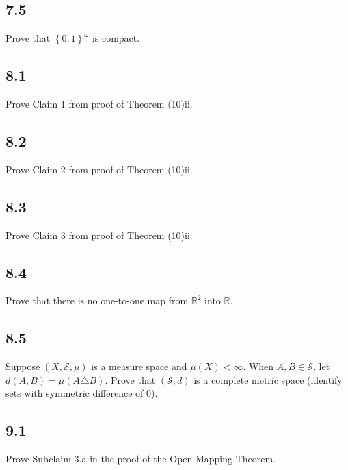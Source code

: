 \documentclass[12pt]{article}
\begin{document}
\subsection*{7.5}
\begin{tcolorbox}
  Prove that $\left\{ 0,1 \right\}^{\omega}$ is compact.
\end{tcolorbox}


\newpage
\subsection*{8.1}
\begin{tcolorbox}
  Prove Claim 1 from proof of Theorem (10)ii. %
\end{tcolorbox}

\subsection*{8.2}
\begin{tcolorbox}
  Prove Claim 2 from proof of Theorem (10)ii. %
\end{tcolorbox}

\subsection*{8.3}
\begin{tcolorbox}
  Prove Claim 3 from proof of Theorem (10)ii.  %
\end{tcolorbox}


\subsection*{8.4}
\begin{tcolorbox}
  Prove that there is no one-to-one map from $\mathbb{R}^{2}$ into $\mathbb{R}$.
\end{tcolorbox}


\subsection*{8.5}
\begin{tcolorbox}
  Suppose $(X,\mathcal{S}, \mu)$ is a measure space and $\mu(X) < \infty$. When $A,B \in \mathcal{S}$, let $d(A,B) = \mu(A\triangle B)$. Prove that 
  $(\mathcal{S}, d)$ is a complete metric space (identify sets with symmetric difference of 0).
\end{tcolorbox}


\newpage
\subsection*{9.1}
\begin{tcolorbox}
  Prove Subclaim 3.a in the proof of the Open Mapping Theorem.
\end{tcolorbox}
\end{document}
